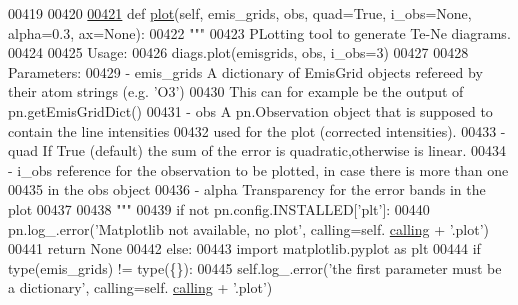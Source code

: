 \begin{DoxyCode}
00419     
00420     
\hypertarget{diags_8py_source_l00421}{}\hyperlink{classpyneb_1_1core_1_1diags_1_1_diagnostics_af8b435b5fd63db75d207a7d1327ce65a}{00421}     \textcolor{keyword}{def }\hyperlink{classpyneb_1_1core_1_1diags_1_1_diagnostics_af8b435b5fd63db75d207a7d1327ce65a}{plot}(self, emis\_grids, obs, quad=True, i\_obs=None, alpha=0.3, ax=None):
00422         \textcolor{stringliteral}{"""}
00423 \textcolor{stringliteral}{        PLotting tool to generate Te-Ne diagrams.}
00424 \textcolor{stringliteral}{        }
00425 \textcolor{stringliteral}{        Usage:}
00426 \textcolor{stringliteral}{            diags.plot(emisgrids, obs, i\_obs=3)}
00427 \textcolor{stringliteral}{            }
00428 \textcolor{stringliteral}{        Parameters:}
00429 \textcolor{stringliteral}{            - emis\_grids    A dictionary of EmisGrid objects refereed by their atom strings (e.g. 'O3')}
00430 \textcolor{stringliteral}{                            This can for example be the output of pn.getEmisGridDict()}
00431 \textcolor{stringliteral}{            - obs           A pn.Observation object that is supposed to contain the line intensities}
00432 \textcolor{stringliteral}{                            used for the plot (corrected intensities).}
00433 \textcolor{stringliteral}{            - quad          If True (default) the sum of the error is quadratic,otherwise is linear.}
00434 \textcolor{stringliteral}{            - i\_obs         reference for the observation to be plotted, in case there is more than one}
00435 \textcolor{stringliteral}{                            in the obs object}
00436 \textcolor{stringliteral}{            - alpha         Transparency for the error bands in the plot}
00437 \textcolor{stringliteral}{            }
00438 \textcolor{stringliteral}{        """}
00439         \textcolor{keywordflow}{if} \textcolor{keywordflow}{not} pn.config.INSTALLED[\textcolor{stringliteral}{'plt'}]: 
00440             pn.log\_.error(\textcolor{stringliteral}{'Matplotlib not available, no plot'}, calling=self.
      \hyperlink{classpyneb_1_1core_1_1diags_1_1_diagnostics_a07dce673fec8b2383ef411ab94b0b2fe}{calling} + \textcolor{stringliteral}{'.plot'})
00441             \textcolor{keywordflow}{return} \textcolor{keywordtype}{None}
00442         \textcolor{keywordflow}{else}:
00443             \textcolor{keyword}{import} matplotlib.pyplot \textcolor{keyword}{as} plt
00444         \textcolor{keywordflow}{if} type(emis\_grids) != type(\{\}):
00445             self.log\_.error(\textcolor{stringliteral}{'the first parameter must be a dictionary'}, calling=self.
      \hyperlink{classpyneb_1_1core_1_1diags_1_1_diagnostics_a07dce673fec8b2383ef411ab94b0b2fe}{calling} + \textcolor{stringliteral}{'.plot'})

\end{DoxyCode}
